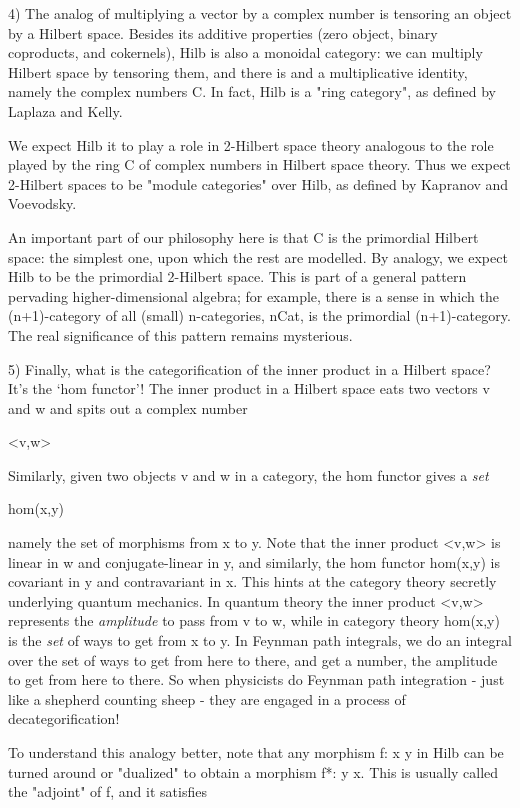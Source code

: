 4) The analog of multiplying a vector by a complex number is tensoring
an object by a Hilbert space.  Besides its additive properties (zero
object, binary coproducts, and cokernels), Hilb is also a monoidal
category: we can multiply Hilbert space by tensoring them, and there
is and a multiplicative identity, namely the complex numbers C.  In
fact, Hilb is a "ring category", as defined by Laplaza and Kelly.

We expect Hilb it to play a role in 2-Hilbert space theory analogous
to the role played by the ring C of complex numbers in Hilbert space
theory.  Thus we expect 2-Hilbert spaces to be "module categories"
over Hilb, as defined by Kapranov and Voevodsky.

An important part of our philosophy here is that C is the primordial
Hilbert space: the simplest one, upon which the rest are modelled.  By
analogy, we expect Hilb to be the primordial 2-Hilbert space.  This is
part of a general pattern pervading higher-dimensional algebra; for
example, there is a sense in which the (n+1)-category of all (small)
n-categories, nCat, is the primordial (n+1)-category. The real
significance of this pattern remains mysterious.

5) Finally, what is the categorification of the inner product in a
Hilbert space?  It's the `hom functor'!  The inner product in a
Hilbert space eats two vectors v and w and spits out a complex number

<v,w>

Similarly, given two objects v and w in a category, the hom functor 
gives a \emph{set}

hom(x,y)

namely the set of morphisms from x to y.  Note that the inner product
<v,w> is linear in w and conjugate-linear in y, and similarly, the hom
functor hom(x,y) is covariant in y and contravariant in x.  This hints
at the category theory secretly underlying quantum mechanics.  In
quantum theory the inner product <v,w> represents the
\emph{amplitude} to
pass from v to w, while in category theory hom(x,y) is the \emph{set} of
ways to get from x to y.  In Feynman path integrals, we do an integral
over the set of ways to get from here to there, and get a number, the
amplitude to get from here to there.  So when physicists do Feynman 
path integration - just like a shepherd counting sheep - they are engaged
in a process of decategorification!


To understand this analogy better, note that any morphism f: x \to  y
in Hilb can be turned around or "dualized" to obtain a
morphism f*: y \to  x.  This is usually called the "adjoint"
of f, and it satisfies

